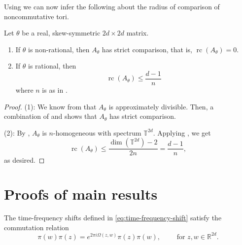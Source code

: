 \documentclass[reqno, a4paper]{amsart}
\numberwithin{equation}{section}
\newcommand{\R}{\mathbb{R}}   %
\newcommand{\T}{\mathbb{T}}   %
\DeclareMathOperator{\rc}{rc}
\begin{document}
Using  we can now infer the following about the radius of comparison of noncommutative tori.

\begin{proposition}
\label{prop:radius-nc-tori}
Let $\theta$ be a real, skew-symmetric $2d \times 2d$ matrix.
\begin{enumerate}
\item 
If $\theta$ is non-rational, then $A_\theta$ has strict comparison, that is, $\rc(A_\theta) = 0$.
\item 
If $\theta$ is rational, then
\[ 
\rc(A_\theta) \leq \frac{d-1}{n} 
\]
where $n$ is as in .
\end{enumerate}
\end{proposition}

\begin{proof}
(1): We know from \cite[Theorem~1.5]{BlaKumRor92} that $A_{\theta}$ is approximately divisible. Then, a combination of \cite[Lemma~3.8]{BlaKumRor92} and \cite[Proposition~6.2]{EllRobSan11} shows that $A_\theta$ has strict comparison.

(2):
By , $A_\theta$ is $n$-homogeneous with spectrum $\T^{2d}$.
Applying , we get
\[
\rc(A_\theta)
\leq \frac{\dim(\T^{2d})-2}{2n}
= \frac{d-1}{n},
\]
as desired.
\end{proof}


\section{Proofs of main results}

The time-frequency shifts defined in \eqref{eq:time-frequency-shift} satisfy the commutation relation
\begin{equation}
\label{eq:commutation-relation}
\pi(w)\pi(z) = e^{2\pi i \Omega(z,w)} \pi(z)\pi(w), 
\qquad \text{ for } z,w \in \R^{2d}. 
\end{equation}
\end{document}
